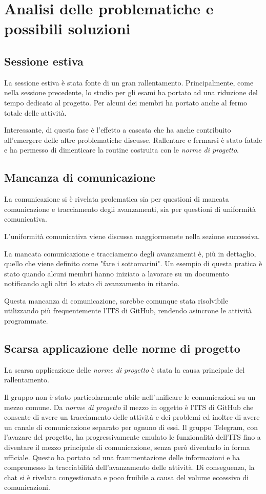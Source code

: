 \section{Analisi delle problematiche e possibili soluzioni}

\subsection{Sessione estiva}

La sessione estiva è stata fonte di un gran rallentamento. 
Principalmente, come nella sessione precedente, lo studio per gli esami ha portato ad una riduzione del tempo dedicato al progetto. Per alcuni dei membri ha portato anche al fermo totale delle attività.

Interessante, di questa fase è l'effetto a cascata che ha anche contribuito all'emergere delle altre problematiche discusse. Rallentare e fermarsi è stato fatale e ha permesso di dimenticare la routine costruita con le \textit{norme di progetto}.

\subsection{Mancanza di comunicazione}

La comunicazione si è rivelata prolematica sia per questioni di mancata comunicazione e tracciamento degli avanzamenti, sia per questioni di uniformità comunicativa.

L'uniformità comunicativa viene discussa maggiormenete nella sezione successiva.

La mancata comunicazione e tracciamento degli avanzamenti è, più in dettaglio, quello che viene definito come "fare i sottomarini". Un esempio di questa pratica è stato quando alcuni membri hanno iniziato a lavorare su un documento notificando agli altri lo stato di avanzamento in ritardo.

Questa mancanza di comunicazione, sarebbe comunque stata risolvibile utilizzando più frequentemente l'ITS di GitHub, rendendo asincrone le attività programmate.

\subsection{Scarsa applicazione delle norme di progetto}

La scarsa applicazione delle \textit{norme di progetto} è stata la causa principale del rallentamento.

Il gruppo non è stato particolarmente abile nell'unificare le comunicazioni su un mezzo comune. Da \textit{norme di progetto} il mezzo in oggetto è l'ITS di GitHub che consente di avere un tracciamento delle attività e dei problemi ed inoltre di avere un canale di comunicazione separato per ognuno di essi. Il gruppo Telegram, con l'avazare del progetto, ha progressivamente emulato le funzionalità dell'ITS fino a diventare il mezzo principale di comunicazione, senza però diventarlo in forma ufficiale. Questo ha portato ad una frammentazione delle informazioni e ha compromesso la tracciabilità dell'avanzamento delle attività. Di conseguenza, la chat si è rivelata congestionata e poco fruibile a causa del volume eccessivo di comunicazioni.

